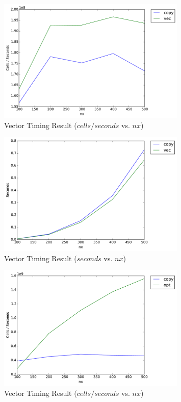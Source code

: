 \begin{figure}[h]
    \centering
    \includegraphics[width=0.8\textwidth]{figs/vec-timing1.pdf}
    \caption{Vector Timing Result ($cells/seconds$ vs. $nx$)}
    \label{fig:vector_timing_result1}
\end{figure}

\begin{figure}[h]
    \centering
    \includegraphics[width=0.8\textwidth]{figs/vec-timing2.pdf}
    \caption{Vector Timing Result ($seconds$ vs. $nx$)}
    \label{fig:vector_timing_result2}
\end{figure}

\begin{figure}[h]
    \centering
    \includegraphics[width=0.8\textwidth]{figs/opt-timing1.pdf}
    \caption{Vector Timing Result ($cells/seconds$ vs. $nx$)}
    \label{fig:opt_timing_result1}
\end{figure}

